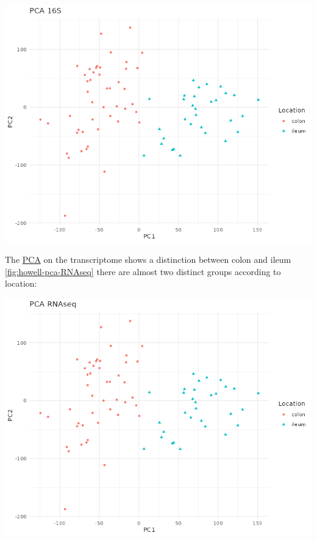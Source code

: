 \documentclass[
  12pt,
  a4paper,
  twoside,
  openright]{book}
\let\origfigure\figure
\let\endorigfigure\endfigure
\renewenvironment{figure}[1][2] {
    \expandafter\origfigure\expandafter[!htbp]
} {
    \endorigfigure
}
\begin{document}
\begin{figure}
\includegraphics[width=1\linewidth]{images/howell_PCA_16S} \caption[PCA of 16S data of the Howell's dataset]{PCA of 16S data of the Howell's dataset. The first component separates the samples by their location. Each point represents a sample (colored and shaped by location).}\label{fig:howell-pca-16s}
\end{figure}

The \protect\hyperlink{acronyms_PCA}{PCA} on the transcriptome shows a distinction between colon and ileum \ref{fig:howell-pca-RNAseq} there are almost two distinct groups according to location:

\begin{figure}
\includegraphics[width=1\linewidth]{images/howell_PCA_RNAseq} \caption[PCA of RNAseq data of the Howell's dataset]{PCA of RNAseq data of the Howell's dataset. There are two groups of samples according to their location. Each point represents a sample (colored and shaped by location).}\label{fig:howell-pca-RNAseq}
\end{figure}
\end{document}
